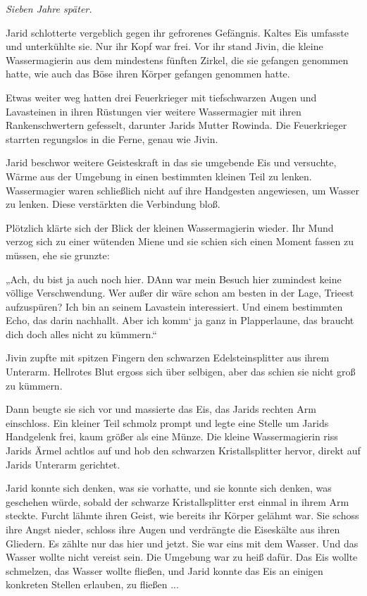 
\textit{Sieben Jahre später.}\bigskip



Jarid schlotterte vergeblich gegen ihr gefrorenes Gefängnis. Kaltes Eis umfasste und unterkühlte sie. Nur ihr Kopf war frei. Vor ihr stand Jivin, die kleine Wassermagierin aus dem mindestens fünften Zirkel, die sie gefangen genommen hatte, wie auch das Böse ihren Körper gefangen genommen hatte.

Etwas weiter weg hatten drei Feuerkrieger mit tiefschwarzen Augen und Lavasteinen in ihren Rüstungen vier weitere Wassermagier mit ihren Rankenschwertern gefesselt, darunter Jarids Mutter Rowinda. Die Feuerkrieger starrten regungslos in die Ferne, genau wie Jivin.

Jarid beschwor weitere Geisteskraft in das sie umgebende Eis und versuchte, Wärme aus der Umgebung in einen bestimmten kleinen Teil zu lenken. Wassermagier waren schließlich nicht auf ihre Handgesten angewiesen, um Wasser zu lenken. Diese verstärkten die Verbindung bloß.

Plötzlich klärte sich der Blick der kleinen Wassermagierin wieder. Ihr Mund verzog sich zu einer wütenden Miene und sie schien sich einen Moment fassen zu müssen, ehe sie grunzte:

„Ach, du bist ja auch noch hier. DAnn war mein Besuch hier zumindest keine völlige Verschwendung. Wer außer dir wäre schon am besten in der Lage, Trieest aufzuspüren? Ich bin an seinem Lavastein interessiert. Und einem bestimmten Echo, das darin nachhallt. Aber ich komm‘ ja ganz in Plapperlaune, das braucht dich doch alles nicht zu kümmern.“

Jivin zupfte mit spitzen Fingern den schwarzen Edelsteinsplitter aus ihrem Unterarm. Hellrotes Blut ergoss sich über selbigen, aber das schien sie nicht groß zu kümmern.

Dann beugte sie sich vor und massierte das Eis, das Jarids rechten Arm einschloss. Ein kleiner Teil schmolz prompt und legte eine Stelle um Jarids Handgelenk frei, kaum größer als eine Münze. Die kleine Wassermagierin riss Jarids Ärmel achtlos auf und hob den schwarzen Kristallsplitter hervor, direkt auf Jarids Unterarm gerichtet.

Jarid konnte sich denken, was sie vorhatte, und sie konnte sich denken, was geschehen würde, sobald der schwarze Kristallsplitter erst einmal in ihrem Arm steckte. Furcht lähmte ihren Geist, wie bereits ihr Körper gelähmt war. Sie schoss ihre Angst nieder, schloss ihre Augen und verdrängte die Eiseskälte aus ihren Gliedern. Es zählte nur das hier und jetzt. Sie war eins mit dem Wasser. Und das Wasser wollte nicht vereist sein. Die Umgebung war zu heiß dafür. Das Eis wollte schmelzen, das Wasser wollte fließen, und Jarid konnte das Eis an einigen konkreten Stellen erlauben, zu fließen ...

